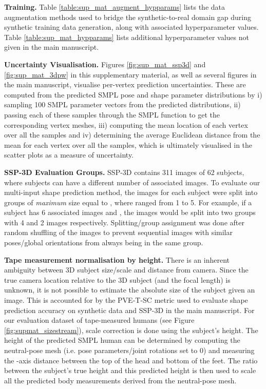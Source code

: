 \documentclass[final]{cvpr}
\begin{document}
\noindent \textbf{Training.} Table \ref{table:sup_mat_augment_hypparams} lists the data augmentation methods used to bridge the synthetic-to-real domain gap during synthetic training data generation, along with associated hyperparameter values. Table \ref{table:sup_mat_hypparams} lists additional hyperparameter values not given in the main manuscript.

\noindent \textbf{Uncertainty Visualisation.} Figures \ref{fig:sup_mat_ssp3d} and \ref{fig:sup_mat_3dpw} in this supplementary material, as well as several figures in the main manuscript, visualise per-vertex prediction uncertainties. These are computed from the predicted SMPL \cite{SMPL:2015} pose and shape parameter distributions by i) sampling 100 SMPL parameter vectors from the predicted distributions, ii) passing each of these samples through the SMPL function to get the corresponding vertex meshes, iii) computing the mean location of each vertex over all the samples and iv) determining the average Euclidean distance from the mean for each vertex over all the samples, which is ultimately visualised in the scatter plots as a measure of uncertainty.

\noindent \textbf{SSP-3D Evaluation Groups.} SSP-3D \cite{STRAPS2020BMVC} contains 311 images of 62 subjects, where subjects can have a different number of associated images. To evaluate our multi-input shape prediction method, the images for each subject were split into groups of \textit{maximum} size equal to , where  ranged from 1 to 5. For example, if a subject has 6 associated images and , the images would be split into two groups with 4 and 2 images respectively. Splitting/group assignment was done after random shuffling of the images to prevent sequential images with similar poses/global orientations from always being in the same group.

\noindent \textbf{Tape measurement normalisation by height.} There is an inherent ambiguity between 3D subject size/scale and distance from camera. Since the true camera location relative to the 3D subject (and the focal length) is unknown, it is not possible to estimate the absolute size of the subject given an image. This is accounted for by the PVE-T-SC \cite{STRAPS2020BMVC} metric used to evaluate shape prediction accuracy on synthetic data and SSP-3D in the main manuscript. For our evaluation dataset of tape-measured humans (see Figure \ref{fig:supmat_sizestream}), scale correction is done using the subject's height. The height of the predicted SMPL human can be determined by computing the neutral-pose mesh (i.e. pose parameters/joint rotations set to 0) and measuring the -axis distance between the top of the head and bottom of the feet. The ratio between the subject's true height and this predicted height is then used to scale all the predicted body measurements derived from the neutral-pose mesh.
\end{document}
